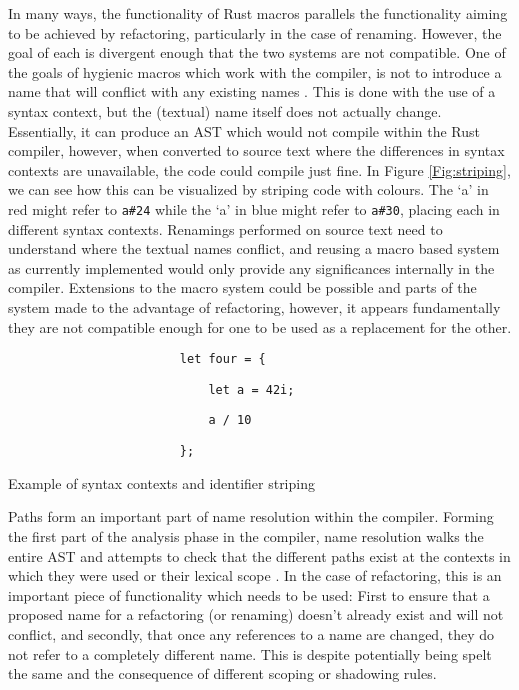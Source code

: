 In many ways, the functionality of Rust macros parallels the functionality aiming to be achieved by refactoring, particularly in the case of renaming. However, the goal of each is divergent enough that the two systems are not compatible. One of the goals of hygienic macros which work with the compiler, is not to introduce a name that will conflict with any existing names \cite{keep15}. This is done with the use of a syntax context, but the (textual) name itself does not actually change. Essentially, it can produce an AST which would not compile within the Rust compiler, however, when converted to source text where the differences in syntax contexts are unavailable, the code could compile just fine. In Figure \ref{Fig:striping}, we can see how this can be visualized by striping code with colours. The `a' in red might refer to {\verb|a#24|} while the `a' in blue might refer to {\verb|a#30|}, placing each in different syntax contexts. Renamings performed on source text need to understand where the textual names conflict, and reusing a macro based system as currently implemented would only provide any significances internally in the compiler. Extensions to the macro system could be possible and parts of the system made to the advantage of refactoring, however, it appears fundamentally they are not compatible enough for one to be used as a replacement for the other.

\begin{fig}
{\color{blue}
\verb|                        let four = {|
}

{\color{red}

\verb|                            let a = 42i;|
}

{
\color{blue}

\verb|                            a / 10|
}

{\color{red}

\verb|                        };|
}

\caption{Example of syntax contexts and identifier striping}
\label{Fig:striping}
\end{fig}

Paths form an important part of name resolution within the compiler. Forming the first part of the analysis phase in the compiler, name resolution walks the entire AST and attempts to check that the different paths exist at the contexts in which they were used or their lexical scope \cite{driver15}. In the case of refactoring, this is an important piece of functionality which needs to be used: First to ensure that a proposed name for a refactoring (or renaming) doesn't already exist and will not conflict, and secondly, that once any references to a name are changed, they do not refer to a completely different name. This is despite potentially being spelt the same and the consequence of different scoping or shadowing rules.

